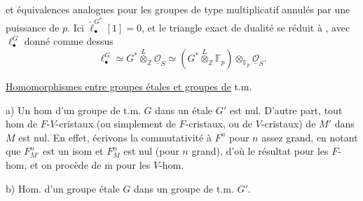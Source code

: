 et équivalences analogues pour les groupes
 de type multiplicatif annulés par une
puissance de $p$. 
Ici $\check\ell_\bullet^{G^*}[1]=0$, et le triangle exact de dualité
se réduit à
,
avec $\ell_\bullet^G$ donné comme dessus
\[
\ell_\bullet^G\simeq G^*\overset L\otimes_{\mathbb Z}
\underline{\mathcal O}_S
\simeq(G^*\overset L\otimes_{\mathbb Z}\mathbb F_p)
\otimes_{\mathbb F_p}\underline{\mathcal O}_S.
\]

\uline{Homomorphismes entre groupes étales et groupes de} t.m.

a) Un hom d'un groupe de t.m. $G$ dans un étale $G'$ est nul.
D'autre part, tout  hom  de
$F$-$V$-cristaux (ou simplement de $F$-cristaux, ou de $V$-cristaux)
de $M'$ dans $M$ est nul.
En effet, écrivons la commutativité à $F^n$ pour $n$ assez grand,
en notant que $F_{M'}^n$ est un isom et $F_M^n$ est nul
(pour $n$ grand), d'où  le résultat pour les $F$-hom,
et on procède de $\overline{\mathrm m}$ pour les $V$-hom.

b) Hom. d'un groupe étale $G$ dans un groupe de t.m. $G'$.
